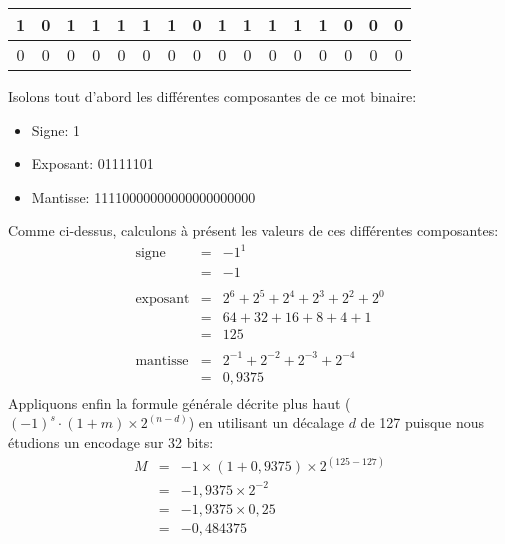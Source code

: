 \documentclass[12pt]{article}
\begin{document}
\begin{MaReponse}
\begin{alphenum}
			\item
			\begin{tabular}{|c|c|c|c|c|c|c|c|c|c|c|c|c|c|c|c|} %
				\hline
				1&0&1&1&1&1&1&0&1&1&1&1&1&0&0&0 \\
				\hline
				0&0&0&0&0&0&0&0&0&0&0&0&0&0&0&0 \\
				\hline
			\end{tabular}
			\par
			Isolons tout d'abord les différentes composantes de ce mot binaire:
			\begin{itemize}
				\item Signe: 1
				\item Exposant: 01111101
				\item Mantisse: 11110000000000000000000
			\end{itemize}
			Comme ci-dessus, calculons à présent les valeurs de ces différentes composantes:
			\[
			\begin{array}{lll}
				\text{signe} & \text{=} & -1^1\\
				& \text{=} & -1\\
				\\
				\text{exposant} & \text{=} & 2^6 + 2^5 + 2^4 + 2^3 + 2^2 + 2^0 \\
				& \text{=} & 64 + 32 + 16 + 8 + 4 + 1\\
				& \text{=} & 125\\
				\\
				\text{mantisse} & \text{=} & 2^{-1} + 2^{-2} + 2^{-3} + 2^{-4}\\
				& \text{=} & 0,9375\\
			\end{array}
			\]
			Appliquons enfin la formule générale décrite plus haut ($(-1)^s\cdot (1+m) \times 2^{(n-d)}$) en utilisant un décalage $d$ de 127 puisque nous étudions un encodage sur 32 bits:
			\[
			\begin{array}{lll}
				M& \text{=} & -1 \times (1+0,9375) \times 2^{(125 - 127)}\\
				& \text{=} & -1,9375 \times 2^{-2}\\
				& \text{=} & -1,9375 \times 0,25\\
				& \text{=} & -0,484375\
			\end{array}
			\]
		\end{alphenum}
	\end{MaReponse}
	
\end{document}

